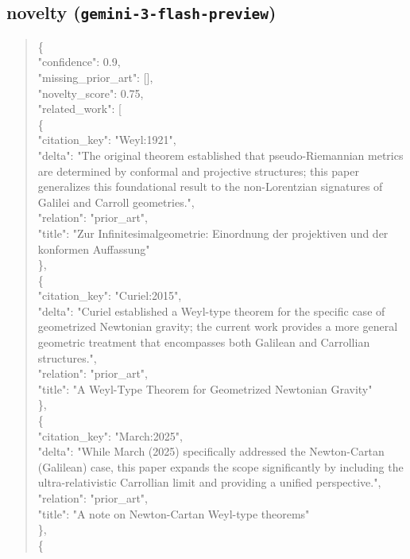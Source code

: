 \documentclass[11pt]{article}
\begin{document}
\subsection*{novelty (\texttt{gemini-3-flash-preview})}
\begin{quote}\small\ttfamily\raggedright
\{\\
  "confidence": 0.9,\\
  "missing\_prior\_art": [],\\
  "novelty\_score": 0.75,\\
  "related\_work": [\\
    \{\\
      "citation\_key": "Weyl:1921",\\
      "delta": "The original theorem established that pseudo-Riemannian metrics are determined by conformal and projective structures; this paper generalizes this foundational result to the non-Lorentzian signatures of Galilei and Carroll geometries.",\\
      "relation": "prior\_art",\\
      "title": "Zur Infinitesimalgeometrie: Einordnung der projektiven und der konformen Auffassung"\\
    \},\\
    \{\\
      "citation\_key": "Curiel:2015",\\
      "delta": "Curiel established a Weyl-type theorem for the specific case of geometrized Newtonian gravity; the current work provides a more general geometric treatment that encompasses both Galilean and Carrollian structures.",\\
      "relation": "prior\_art",\\
      "title": "A Weyl-Type Theorem for Geometrized Newtonian Gravity"\\
    \},\\
    \{\\
      "citation\_key": "March:2025",\\
      "delta": "While March (2025) specifically addressed the Newton-Cartan (Galilean) case, this paper expands the scope significantly by including the ultra-relativistic Carrollian limit and providing a unified perspective.",\\
      "relation": "prior\_art",\\
      "title": "A note on Newton-Cartan Weyl-type theorems"\\
    \},\\
    \{\\

\end{quote}
\end{document}
